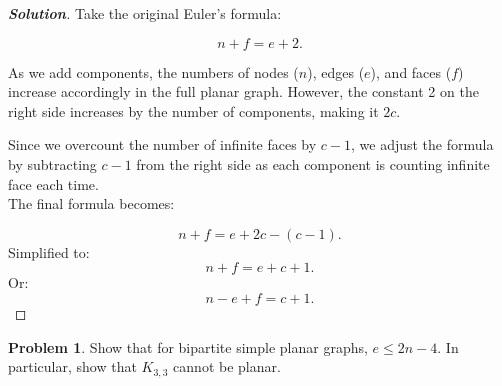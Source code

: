 \documentclass[12pt]{article}
\theoremstyle{definition}
\newtheorem{p}{Problem}
\newenvironment{solution}
  {\begin{mdframed}[linewidth=0.5pt, roundcorner=10pt, linecolor=black]\begin{proof}[\bfseries Solution]}
  {\qedhere\end{proof}\end{mdframed}}
\begin{document}
  \begin{solution} 
  Take the original Euler's formula:
  
  \[
  n + f = e + 2.
  \]
  
  As we add components, the numbers of nodes (\( n \)), edges (\( e \)), and faces (\( f \)) increase accordingly in the full planar graph. However, the constant 2 on the right side increases by the number of components, making it \( 2c \).
  
  Since we overcount the number of infinite faces by \( c - 1 \), we adjust the formula by subtracting \( c - 1 \) from the right side as each component is counting infinite face each time. \\
  The final formula becomes:
  
  \[
  n + f = e + 2c - (c - 1).
  \]
  Simplified to:
  \[
  n + f = e + c + 1.
  \]
  Or: 
  \[
  n - e + f = c + 1.
  \]
  
\end{solution}
  

\vspace{0.9cm}
\begin{p} 
  Show that for bipartite simple planar graphs, $e \leq 2n - 4$. In particular, show that $K_{3,3}$ cannot be planar. 
\end{p}
\vspace{0.3cm}
\end{document}
